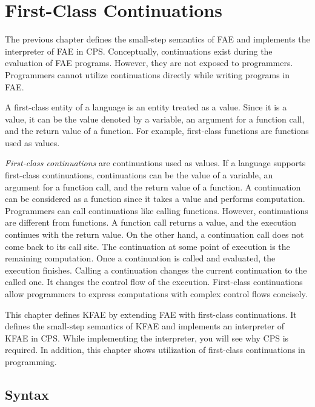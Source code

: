 \chapter{First-Class Continuations}

\renewcommand{\plang}{\textsf{FAE}\xspace}
\renewcommand{\Lang}{\textsf{KFAE}\xspace}

The previous chapter defines the small-step semantics of \plang and implements
the interpreter of \plang in CPS. Conceptually,
continuations exist during the evaluation of \plang programs. However, they are
not exposed to programmers. Programmers cannot utilize continuations directly while
writing programs in \plang.

A first-class entity of a language is an entity treated as a
value. Since it is a value, it can be the value denoted by a variable, an argument for a
function call, and the return value of a function. For example, first-class
functions are functions used as values.

\textit{First-class continuations}
are continuations used as values. If a language
supports first-class continuations, continuations can be the value of a variable,
an argument for a function call, and the return value of a function. A
continuation can be considered as a function since it takes a value and performs
computation. Programmers can call continuations like calling functions. However,
continuations are different from functions. A function call returns a value, and
the execution continues with the return value. On the other hand, a continuation
call does not come back to its call site. The continuation at some point of execution
is the remaining computation. Once a continuation is called and evaluated,
the execution finishes. Calling a continuation changes the
current continuation to the called one. It changes the control flow of the
execution. First-class continuations allow programmers to express
computations with complex control flows concisely.

This chapter defines \Lang by extending \plang with first-class continuations.
It defines the small-step semantics of \Lang and implements an interpreter of
\Lang in CPS. While implementing the interpreter, you will see why CPS is required.
In addition, this chapter shows utilization of first-class continuations in
programming.

\section{Syntax}

